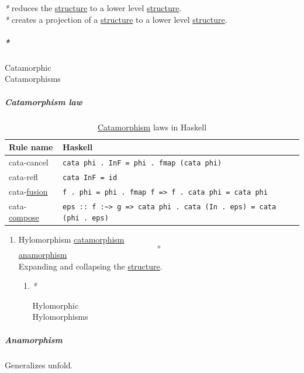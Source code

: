 \documentclass[11pt]{article}
\begin{document}
\emph{*} reduces the \hyperref[org93ee82c]{structure} to a lower level \hyperref[org93ee82c]{structure}.\\
\emph{*} creates a projection of a \hyperref[org93ee82c]{structure} to a lower level \hyperref[org93ee82c]{structure}.\\

\subparagraph{\emph{*}}
\label{sec:orge42a5ab}

\label{org5a5ca25}Catamorphic\\
\label{orge1d571a}Catamorphisms\\

\subparagraph{\label{org5f0ddf3}Catamorphism law}
\label{sec:orgff0f2cb}
\begin{table}[htbp]
\caption{\label{tab:catamorphism-law-in-haskell}\hyperref[org9f46ed9]{Catamorphism} laws in Haskell}
\centering
\begin{tabular}{ll}
Rule name & Haskell\\
\hline
cata-cancel & \texttt{cata phi . InF = phi . fmap (cata phi)}\\
cata-refl & \texttt{cata InF = id}\\
cata-\hyperref[orgc7afdd4]{fusion} & \texttt{f . phi = phi . fmap f => f . cata phi = cata phi}\\
cata-\hyperref[orgb292e6e]{compose} & \texttt{eps :: f :\textasciitilde{}> g => cata phi . cata (In . eps) = cata (phi . eps)}\\
\end{tabular}
\end{table}

\begin{enumerate}
\item \label{org197e143}Hylomorphism
\label{sec:org1e8befd}
\hyperref[org9f46ed9]{catamorphism} $$ \circ $$ \hyperref[org3ffaead]{anamorphism}\\

Expanding and collapsing the \hyperref[org93ee82c]{structure}.\\

\begin{enumerate}
\item \emph{*}
\label{sec:orgd3f3ca5}

\label{org5e77dad}Hylomorphic\\
\label{orge7fb878}Hylomorphisms\\
\end{enumerate}
\end{enumerate}

\subparagraph{\label{org3ffaead}Anamorphism}
\label{sec:orga1e6d97}
Generalizes unfold.\\
\end{document}

